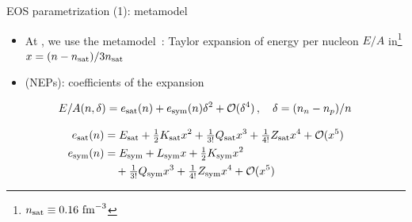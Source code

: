 \documentclass[usenames,dvipsnames,t]{beamer}
\begin{document}
\begin{frame}{EOS parametrization (1): metamodel}

  \def\x{3mm}

  \begin{itemize}
    \item At , we use the metamodel~\cite{Margueron:2017eqc,Margueron:2017lup}: Taylor expansion of energy per nucleon $E/A$ in\footnote{$n_{\rm{sat}} \equiv 0.16 \ \rm{fm}^{-3}$} $x = (n - n_{\rm{sat}}) / 3n_{\rm{sat}}$

    \vspace{\x}

    \item {} (NEPs): coefficients of the expansion
  \end{itemize}

  \vspace{\x}

  \begin{equation*}
    E/A(n, \delta) = e_{\rm{sat}}(n) + e_{\rm{sym}}(n) \delta^2  + \mathcal{O}(\delta^4) \, , \quad \delta = (n_n - n_p) / n \,
  \end{equation*}

  \begin{align*}
    e_{\rm{sat}}(n) &= E_{\rm{sat}} + \tfrac12 K_{\rm{sat}} x^2 + \tfrac{1}{3!} Q_{\rm{sat}} x^3 + \tfrac{1}{4!} Z_{\rm{sat}} x^4 + \mathcal{O}(x^5) \\
    e_{\rm{sym}}(n) &= E_{\rm{sym}} + L_{\rm{sym}} x + \tfrac12 K_{\rm{sym}} x^2  \\
    & \quad + \tfrac{1}{3!} Q_{\rm{sym}} x^3 + \tfrac{1}{4!} Z_{\rm{sym}} x^4 + \mathcal{O}(x^5)
  \end{align*}

\end{frame}
\end{document}
